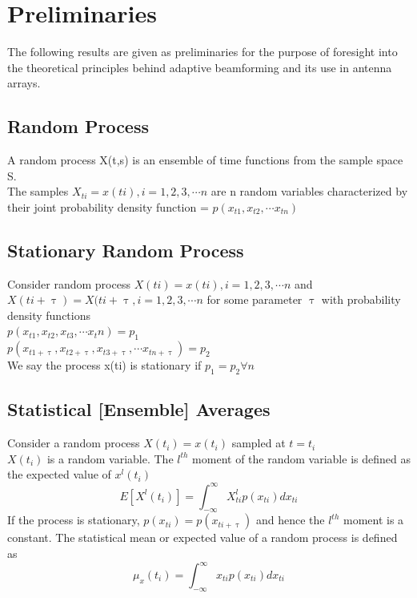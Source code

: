 \section{\LARGE Preliminaries}

The following results are given as preliminaries for the purpose of foresight into the theoretical principles behind adaptive beamforming and its use in antenna arrays.

\subsection{Random Process}

A random process X(t,s) is an ensemble of time functions from the sample space S. \\The samples $X_{ti} = x(ti), i = 1, 2, 3, \cdots n$ are n random variables characterized by their joint probability density function = $p(x_{t1}, x_{t2}, \cdots x_{tn})$

\subsection{Stationary Random Process}

Consider random process $X(ti) = x(ti), i = 1, 2, 3, \cdots n$ and \\
$X(ti + \uptau) = X(ti + \uptau, i = 1, 2, 3, \cdots n$ for some parameter $\uptau$ with probability density functions \\ 
\indent $p(x_{t1}, x_{t2}, x_{t3}, \cdots x_tn) = p_1$ \\
\indent $p(x_{t1+\uptau}, x_{t2+\uptau}, x_{t3+\uptau}, \cdots x_{tn+\uptau}) = p_2$ \\
We say the process x(ti) is stationary  if $p_1 = p_2 \forall n $


\subsection{Statistical [Ensemble] Averages}
Consider a random process $X(t_i) = x(t_i)$ sampled at $t = t_i$\\ $X(t_i)$ is a random variable.
The $l^{th}$ moment of the random variable is defined as the expected value of $x^l(t_i)$ \\
\indent $$E[X^l(t_i)] = \int_{-\infty}^{\infty} X_{ti}^l p(x_{ti}) dx_{ti}$$
If the process is stationary, $p(x_{ti}) = p(x_{ti + \uptau})$ and hence the $l^{th}$ moment is a constant. The statistical mean or expected value of a random process is defined as $$\mu_{x}(t_i) = \int_{-\infty}^{\infty} x_{ti} p(x_{ti}) dx_{ti}$$

